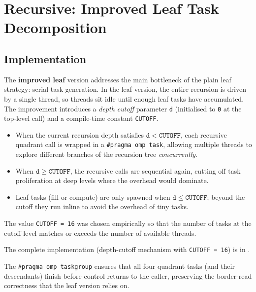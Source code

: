 \section{Recursive: Improved Leaf Task Decomposition}
\label{sec:rec-improved}

\subsection{Implementation}
\label{sec:rec-improved-impl}

The \textbf{improved leaf} version addresses the main bottleneck of the plain leaf
strategy: serial task generation.
In the leaf version, the entire recursion is driven by a single thread, so threads
sit idle until enough leaf tasks have accumulated.
The improvement introduces a \emph{depth cutoff} parameter \texttt{d} (initialised to
\texttt{0} at the top-level call) and a compile-time constant \texttt{CUTOFF}.

\begin{itemize}
    \item When the current recursion depth satisfies $\mathtt{d} < \mathtt{CUTOFF}$,
          each recursive quadrant call is wrapped in a \texttt{\#pragma~omp~task},
          allowing multiple threads to explore different branches of the recursion tree
          \emph{concurrently}.
    \item When $\mathtt{d} \ge \mathtt{CUTOFF}$, the recursive calls are sequential
          again, cutting off task proliferation at deep levels where the overhead would
          dominate.
    \item Leaf tasks (fill or compute) are only spawned when $\mathtt{d} \le
          \mathtt{CUTOFF}$; beyond the cutoff they run inline to avoid the overhead of
          tiny tasks.
\end{itemize}

The value \texttt{CUTOFF = 16} was chosen empirically so that the number of tasks at
the cutoff level matches or exceeds the number of available threads.

\begin{sloppypar}
The complete implementation (depth-cutoff mechanism with \texttt{CUTOFF = 16}) is in .
\end{sloppypar}

The \texttt{\#pragma~omp~taskgroup} ensures that all four quadrant tasks (and their
descendants) finish before control returns to the caller, preserving the border-read
correctness that the leaf version relies on.


